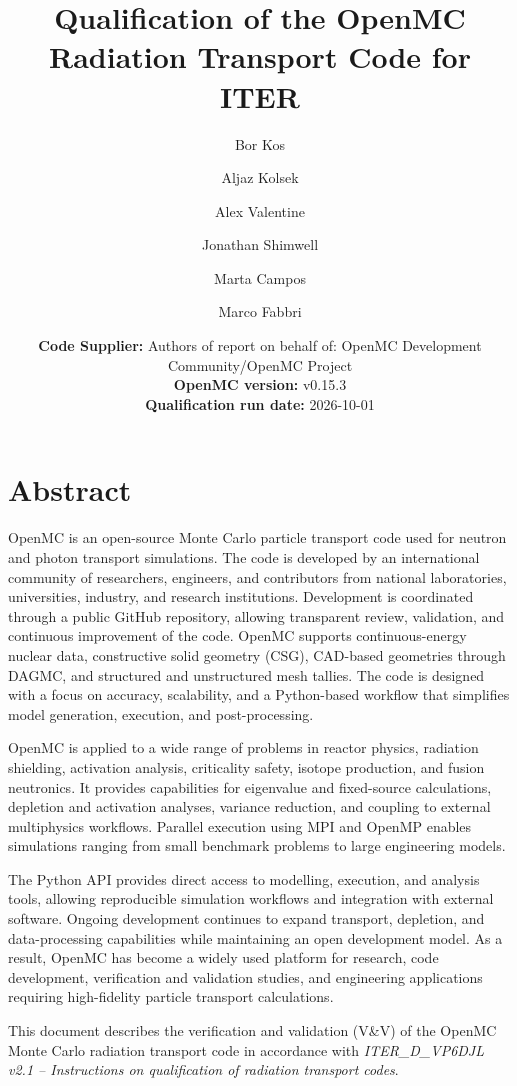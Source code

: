 \documentclass[11pt,a4paper]{article}
\title{Qualification of the OpenMC Radiation Transport Code for ITER}
\author[1]{Bor Kos}
\author[2]{Aljaz Kolsek}
\author[3]{Alex Valentine}
\author[4]{Jonathan Shimwell}
\author[2]{Marta Campos}
\author[2]{Marco Fabbri}
\affil[1]{F4E, External}
\affil[2]{F4E}
\affil[3]{UKAEA}
\affil[3]{Proxima Fusion}
\date{
\textbf{Code Supplier:} Authors of report on behalf of: OpenMC Development Community/OpenMC Project \\
\vspace{0.5em}
\textbf{OpenMC version:} v0.15.3\\
\vspace{0.5em}
\textbf{Qualification run date:} 2026-10-01
}
\begin{document}
\maketitle
\thispagestyle{empty}
\clearpage

\tableofcontents
\clearpage

\section{Abstract}
OpenMC is an open-source Monte Carlo particle transport code used for neutron and photon transport simulations. 
The code is developed by an international community of researchers, engineers, and contributors from national laboratories, universities, industry, and research institutions. 
Development is coordinated through a public GitHub repository, allowing transparent review, validation, and continuous improvement of the code. 
OpenMC supports continuous-energy nuclear data, constructive solid geometry (CSG), CAD-based geometries through DAGMC, and structured and unstructured mesh tallies. 
The code is designed with a focus on accuracy, scalability, and a Python-based workflow that simplifies model generation, execution, and post-processing. 

OpenMC is applied to a wide range of problems in reactor physics, radiation shielding, activation analysis, criticality safety, isotope production, and fusion neutronics. 
It provides capabilities for eigenvalue and fixed-source calculations, depletion and activation analyses, variance reduction, and coupling to external multiphysics workflows. 
Parallel execution using MPI and OpenMP enables simulations ranging from small benchmark problems to large engineering models. 

The Python API provides direct access to modelling, execution, and analysis tools, allowing reproducible simulation workflows and integration with external software. 
Ongoing development continues to expand transport, depletion, and data-processing capabilities while maintaining an open development model. 
As a result, OpenMC has become a widely used platform for research, code development, verification and validation studies, and engineering applications requiring high-fidelity particle transport calculations.

This document describes the verification and validation (V\&V) of the
OpenMC Monte Carlo radiation transport code in accordance with
\emph{ITER\_D\_VP6DJL v2.1 -- Instructions on qualification of radiation transport codes}.
\end{document}
